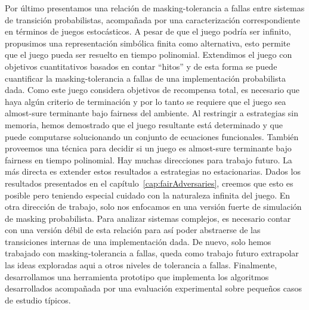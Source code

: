 Por último presentamos una relación de masking-tolerancia a fallas entre sistemas de transición probabilistas, acompañada por una caracterización correspondiente en términos de juegos estocásticos. A pesar de que el juego podría ser infinito, propusimos una representación simbólica finita como alternativa, esto permite que el juego pueda ser resuelto en tiempo polinomial.
%
Extendimos el juego con objetivos cuantitativos basados en contar ``hitos'' y de esta forma se puede cuantificar la masking-tolerancia a fallas de una implementación probabilista dada.
%
Como este juego considera objetivos de recompensa total, es necesario que haya algún criterio de terminación y por lo tanto se requiere que el juego sea almost-sure terminante bajo fairness del ambiente.
%
Al restringir a estrategias sin memoria, hemos demostrado que el juego resultante está determinado y que puede computarse solucionando un conjunto de ecuaciones funcionales. También proveemos una técnica para decidir si un juego es almost-sure terminante bajo fairness en tiempo polinomial.
%
Hay muchas direcciones para trabajo futuro. La más directa es extender estos resultados a estrategias no estacionarias. Dados los resultados presentados en el capítulo~\ref{cap:fairAdversaries}, creemos que esto es posible pero teniendo especial cuidado con la naturaleza infinita del juego.
%
En otra dirección de trabajo, solo nos enfocamos en una versión fuerte de simulación de masking probabilista. Para analizar sistemas complejos, es necesario contar con una versión débil de esta relación para así poder abstraerse de las transiciones internas de una implementación dada.
%
De nuevo, solo hemos trabajado con masking-tolerancia a fallas, queda como trabajo futuro extrapolar las ideas exploradas aqui a otros niveles de tolerancia a fallas.
%
Finalmente, desarrollamos una herramienta prototipo que implementa los algoritmos desarrollados acompañada por una evaluación experimental sobre pequeños casos de estudio típicos.
